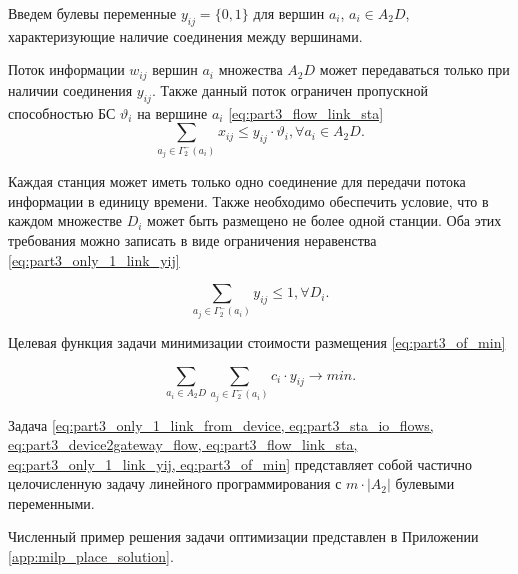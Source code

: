 Введем булевы переменные $y_{ij} = \{0,1\}$ для вершин $a_i$, $a_i \in A_2D$, характеризующие наличие соединения между вершинами.

Поток информации $w_{ij}$ вершин $a_i$ множества $A_2D$ может передаваться только при наличии соединения $y_{ij}$. Также данный поток ограничен пропускной способностью БС $\vartheta_i$ на вершине $a_i$ \cref{eq:part3_flow_link_sta}
\begin{equation}\label{eq:part3_flow_link_sta}
    \sum_{a_j \in \Gamma_2^-(a_i)} x_{ij} \leqslant y_{ij} \cdot \vartheta_i, \forall a_i \in A_2D.
\end{equation}

Каждая станция может иметь только одно соединение для передачи потока информации в единицу времени. Также необходимо обеспечить условие, что в каждом множестве $D_i$ может быть размещено не более одной станции. Оба этих требования можно записать в виде ограничения неравенства \cref{eq:part3_only_1_link_yij}

\begin{equation}\label{eq:part3_only_1_link_yij}
    \sum_{a_j \in \Gamma_2^-(a_i)} y_{ij} \leqslant 1, \forall D_i.
\end{equation}

Целевая функция задачи минимизации стоимости размещения \cref{eq:part3_of_min}

\begin{equation}\label{eq:part3_of_min}
    \sum_{a_i \in A_2D} \sum_{a_j \in \Gamma_2^-(a_i)}c_i \cdot y_{ij} \to min.
\end{equation}

Задача \cref{eq:part3_only_1_link_from_device, eq:part3_sta_io_flows, eq:part3_device2gateway_flow, eq:part3_flow_link_sta, eq:part3_only_1_link_yij, eq:part3_of_min} представляет собой частично целочисленную задачу линейного программирования с $m \cdot |A_2|$ булевыми переменными.

Численный пример решения задачи оптимизации представлен в Приложении \cref{app:milp_place_solution}.


